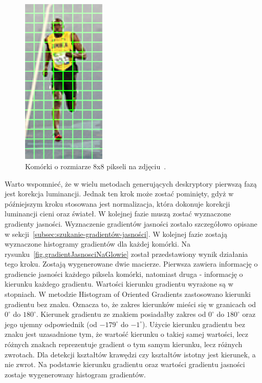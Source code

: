\documentclass[a4paper,twoside,12pt]{book}
\begin{document}
    \begin{figure}
        \centering
        \includegraphics[width=4cm]{Obrazy/komorkiHoga.jpg}
        \caption{Komórki o rozmiarze 8x8 pikseli na zdjęciu~\cite{hogOpenCv}.}
        \label{fig.komorkiHoga}
    \end{figure}
    Warto wspomnieć, że w wielu metodach generujących deskryptory pierwszą fazą jest korekcja luminancji.
    Jednak ten krok może zostać pominięty, gdyż w późniejszym kroku stosowana jest normalizacja,
    która dokonuje korekcji luminancji cieni oraz świateł.
    W kolejnej fazie muszą zostać wyznaczone gradienty jasności.
    Wyznaczenie gradientów jasności zostało szczegółowo opisane w sekcji~\ref{subsec:szukanie-gradientów-jasności}.
    W kolejnej fazie zostają wyznaczone histogramy gradientów dla każdej komórki.
    Na rysunku~\ref{fig.gradientJasnosciNaGlowie} został przedstawiony wynik działania tego kroku.
    Zostają wygenerowane dwie macierze. Pierwsza zawiera informację o gradiencie jasności każdego piksela komórki,
    natomiast druga - informację o kierunku każdego gradientu.
    Wartości kierunku gradientu wyrażone są w stopniach. W metodzie Histogram of Oriented Gradients
    zastosowano kierunki gradientu bez znaku. Oznacza to, że zakres kierunków mieści się w granicach od $0^{\circ}$ do $180^{\circ}$.
    Kierunek gradientu ze znakiem posiadałby zakres od $0^{\circ}$ do $180^{\circ}$ oraz jego ujemny odpowiednik
    (od $-179^{\circ}$ do $-1^{\circ}$). Użycie kierunku gradientu bez znaku jest uzasadnione tym,
    że wartość kierunku o takiej samej wartości, lecz różnych znakach reprezentuje gradient o tym samym kierunku, lecz
    różnych zwrotach. Dla detekcji kształtów krawędzi czy kształtów istotny jest kierunek, a nie zwrot.
    Na podstawie kierunku gradientu oraz wartości gradientu jasności zostaje wygenerowany histogram gradientów.
\end{document}
